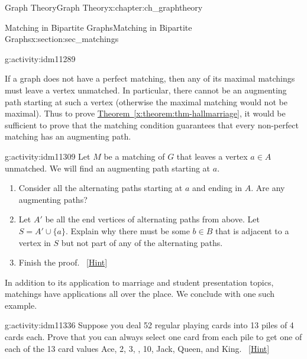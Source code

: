 \documentclass[oneside,10pt,]{book}
\numberwithin{equation}{chapter}
\newcommand{\vtx}[2]{node[fill,circle,inner sep=0pt, minimum size=4pt,label=#1:#2]{}}
\renewcommand{\v}{\vtx{above}{}}
\begin{document}
\begin{chapterptx}{Graph Theory}{}{Graph Theory}{}{}{x:chapter:ch_graphtheory}
\begin{sectionptx}{Matching in Bipartite Graphs}{}{Matching in Bipartite Graphs}{}{}{x:section:sec_matchings}
\begin{activity}{}{g:activity:idm11289}
\begin{enumerate}[font=\bfseries,label=(\alph*),ref=\alph*]
\begin{sidebyside}{1}{0.25}{0.25}{0}
\begin{sbspanel}{0.5}
{
}%
\end{sbspanel}%
\end{sidebyside}%
\end{enumerate}
\end{activity}
If a graph does not have a perfect matching, then any of its maximal matchings must leave a vertex unmatched.  In particular, there cannot be an augmenting path starting at such a vertex (otherwise the maximal matching would not be maximal).  Thus to prove \hyperref[x:theorem:thm-hallmarriage]{Theorem~\ref{x:theorem:thm-hallmarriage}}, it would be sufficient to prove that the matching condition guarantees that every non-perfect matching has an augmenting path.%
\begin{activity}{}{g:activity:idm11309}%
Let \(M\) be a matching of \(G\) that leaves a vertex \(a \in A\) unmatched.  We will find an augmenting path starting at \(a\).%
\begin{enumerate}[font=\bfseries,label=(\alph*),ref=\alph*]
\item{}Consider all the alternating paths starting at \(a\) and ending in \(A\).  Are any augmenting paths?%
\item{}Let \(A'\) be all the end vertices of alternating paths from above.  Let \(S = A' \cup \{a\}\).  Explain why there must be some \(b \in B\) that is adjacent to a vertex in \(S\) but not part of any of the alternating paths.%
\item{}Finish the proof.%
\qquad~\hfill{\tiny\hyperlink{g:hint:idm11331-back}{[Hint]}}\end{enumerate}
\end{activity}
In addition to its application to marriage and student presentation topics, matchings have applications all over the place. We conclude with one such example.%
\begin{activity}{}{g:activity:idm11336}%
Suppose you deal 52 regular playing cards into 13 piles of 4 cards each. Prove that you can always select one card from each pile to get one of each of the 13 card values Ace, 2, 3, \textellipsis{}, 10, Jack, Queen, and King.%
\qquad~\hfill{\tiny\hyperlink{g:hint:idm11340-back}{[Hint]}}\end{activity}

\end{sectionptx}
\end{chapterptx}
\end{document}
